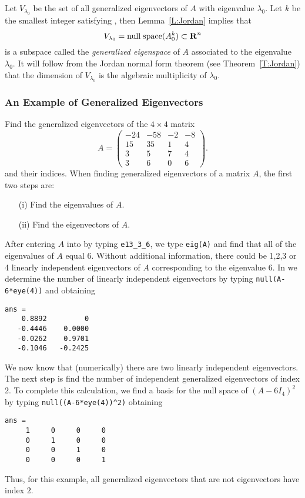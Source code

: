 Let $V_{\lambda_0}$ be the set of all generalized eigenvectors of $A$ with 
eigenvalue $\lambda_0$.  Let $k$ be the smallest integer satisfying
, then Lemma~\ref{L:Jordan} implies that 
\[
V_{\lambda_0}={\rm null\;space}(A_0^k)\subset \mbox{$\bf{R}$}^n
\]
is a subspace called the {\em generalized eigenspace\/}
 of $A$ associated to the eigenvalue
$\lambda_0$.  It will follow from the Jordan normal form theorem (see
Theorem~\ref{T:Jordan}) that the dimension of $V_{\lambda_0}$ is the 
algebraic multiplicity of $\lambda_0$.


\subsubsection*{An Example of Generalized Eigenvectors}

Find the generalized eigenvectors of the $4\times 4$ matrix
\begin{equation*}
A=\left(\begin{array}{rrrr}
  -24 & -58 &  -2 &  -8\\
   15 &  35 &   1 &   4\\
    3 &   5 &   7 &   4\\
    3 &   6 &   0 &   6
\end{array}\right).
\end{equation*}
and their indices.  When finding generalized eigenvectors of a matrix $A$, 
the first two steps are:
\begin{enumerate}
\item[(i)]  Find the eigenvalues of $A$.
\item[(ii)]  Find the eigenvectors of $A$.
\end{enumerate}
After entering $A$ into \Matlab by typing {\tt e13\_3\_6}, we type 
{\tt eig(A)} and find that all of the eigenvalues of $A$ equal $6$.  Without 
additional information, there could be 1,2,3 or 4 linearly independent 
eigenvectors of $A$ corresponding to the eigenvalue $6$.  In \Matlab we 
determine the number of linearly independent eigenvectors by typing 
{\tt null(A-6*eye(4))} and obtaining
\begin{verbatim}
ans =
    0.8892         0
   -0.4446    0.0000
   -0.0262    0.9701
   -0.1046   -0.2425
\end{verbatim}
 
We now know that (numerically) there are two linearly independent
eigenvectors.  The next step is find the number of independent generalized 
eigenvectors of index 2.  To complete this calculation, we find 
a basis for the null space of $(A-6I_4)^2$ by typing 
{\tt null((A-6*eye(4))\^{ }2)} obtaining
\begin{verbatim}
ans =
     1     0     0     0
     0     1     0     0
     0     0     1     0
     0     0     0     1
\end{verbatim}
Thus, for this example, all generalized eigenvectors that are not
eigenvectors have index $2$.

